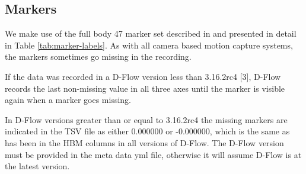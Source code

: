 \documentclass{article}
\begin{document}
\subsection{Markers}
%
We make use of the full body 47 marker set described in \cite{Ton's HBM paper}
and presented in detail in Table \ref{tab:marker-labels}. As with all camera
based motion capture systems, the markers sometimes go missing in the
recording.

If the data was recorded in a D-Flow version less than 3.16.2rc4 [3], D-Flow
records the last non-missing value in all three axes until the marker is
visible again when a marker goes missing.

In D-Flow versions greater than or equal to 3.16.2rc4 the missing markers are
indicated in the TSV file as either 0.000000 or -0.000000, which is the same as
has been in the HBM columns in all versions of D-Flow. The D-Flow version must
be provided in the meta data yml file, otherwise it will assume D-Flow is at
the latest version.
\end{document}
